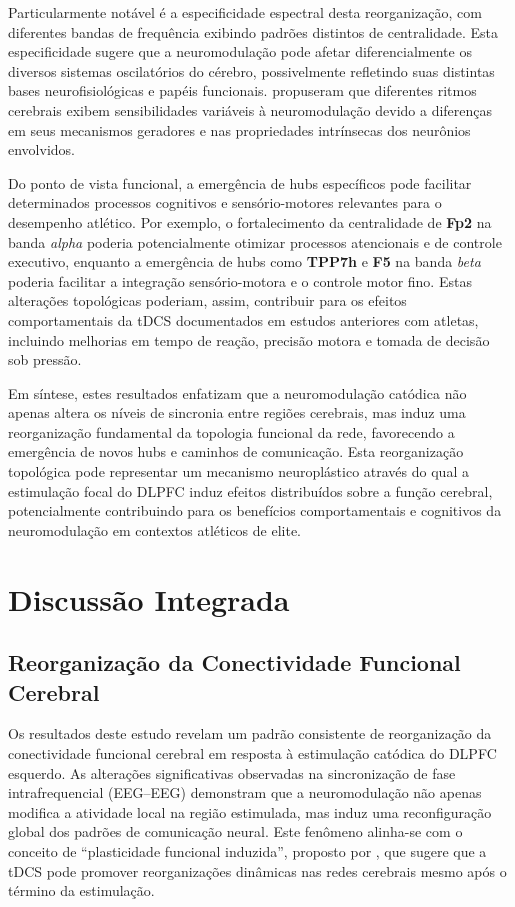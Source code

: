 Particularmente notável é a especificidade espectral desta reorganização, com diferentes bandas de frequência exibindo padrões distintos de centralidade. Esta especificidade sugere que a neuromodulação pode afetar diferencialmente os diversos sistemas oscilatórios do cérebro, possivelmente refletindo suas distintas bases neurofisiológicas e papéis funcionais. \cite{scheler2019neuromodulation} propuseram que diferentes ritmos cerebrais exibem sensibilidades variáveis à neuromodulação devido a diferenças em seus mecanismos geradores e nas propriedades intrínsecas dos neurônios envolvidos.

Do ponto de vista funcional, a emergência de hubs específicos pode facilitar determinados processos cognitivos e sensório-motores relevantes para o desempenho atlético. Por exemplo, o fortalecimento da centralidade de \textbf{Fp2} na banda \emph{alpha} poderia potencialmente otimizar processos atencionais e de controle executivo, enquanto a emergência de hubs como \textbf{TPP7h} e \textbf{F5} na banda \emph{beta} poderia facilitar a integração sensório-motora e o controle motor fino. Estas alterações topológicas poderiam, assim, contribuir para os efeitos comportamentais da tDCS documentados em estudos anteriores com atletas, incluindo melhorias em tempo de reação, precisão motora e tomada de decisão sob pressão.

Em síntese, estes resultados enfatizam que a neuromodulação catódica não apenas altera os níveis de sincronia entre regiões cerebrais, mas induz uma reorganização fundamental da topologia funcional da rede, favorecendo a emergência de novos hubs e caminhos de comunicação. Esta reorganização topológica pode representar um mecanismo neuroplástico através do qual a estimulação focal do DLPFC induz efeitos distribuídos sobre a função cerebral, potencialmente contribuindo para os benefícios comportamentais e cognitivos da neuromodulação em contextos atléticos de elite.

\section{Discussão Integrada}

\subsection{Reorganização da Conectividade Funcional Cerebral}
Os resultados deste estudo revelam um padrão consistente de reorganização da conectividade funcional cerebral em resposta à estimulação catódica do DLPFC esquerdo. As alterações significativas observadas na sincronização de fase intrafrequencial (EEG--EEG) demonstram que a neuromodulação não apenas modifica a atividade local na região estimulada, mas induz uma reconfiguração global dos padrões de comunicação neural. Este fenômeno alinha-se com o conceito de ``plasticidade funcional induzida'', proposto por \cite{kunze2014high}, que sugere que a tDCS pode promover reorganizações dinâmicas nas redes cerebrais mesmo após o término da estimulação.

